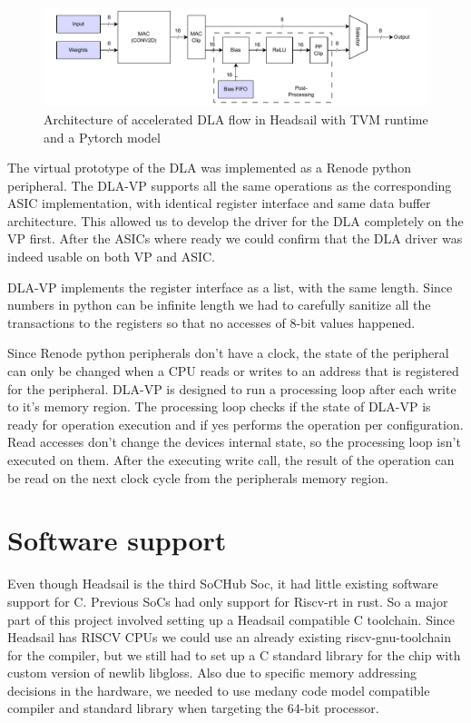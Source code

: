 \documentclass[12pt,a4paper,english
]{tunithesis}
\begin{document}
\begin{figure}
  \centering
  \includegraphics[width=\linewidth]{img/dla-internal.pdf}
  \caption{Architecture of accelerated DLA flow in Headsail with TVM runtime and a Pytorch model}
  \label{fig:dla_internal}
\end{figure}


The virtual prototype of the DLA was implemented as a Renode python peripheral. The DLA-VP supports all the same operations as the corresponding ASIC implementation, with identical register interface and same data buffer architecture. This allowed us to develop the driver for the DLA completely on the VP first. After the ASICs where ready we could confirm that the DLA driver was indeed usable on both VP and ASIC.

DLA-VP implements the register interface as a list, with the same length. Since numbers in python can be infinite length we had to carefully sanitize all the transactions to the registers so that no accesses of 8-bit values happened.

Since Renode python peripherals don't have a clock, the state of the peripheral can only be changed when a CPU reads or writes to an address that is registered for the peripheral. DLA-VP is designed to run a processing loop after each write to it's memory region. The processing loop checks if the state of DLA-VP is ready for operation execution and if yes performs the operation per configuration. Read accesses don't change the devices internal state, so the processing loop isn't executed on them. After the executing write call, the result of the operation can be read on the next clock cycle from the peripherals memory region.

\section{Software support}
\label{sec:software_support}
Even though Headsail is the third SoCHub Soc, it had little existing software support for C. Previous SoCs had only support for Riscv-rt in rust. So a major part of this project involved setting up a Headsail compatible C toolchain. Since Headsail has RISCV CPUs we could use an already existing riscv-gnu-toolchain for the compiler, but we still had to set up a C standard library for the chip with custom version of newlib libgloss. Also due to specific memory addressing decisions in the hardware, we needed to use medany code model compatible compiler and standard library when targeting the 64-bit processor.
\end{document}
